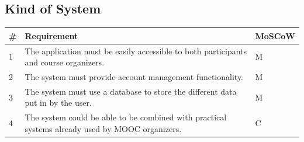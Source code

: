 \subsection{Kind of System}
\begin{tabular}{ | p{0.5cm} | p{12cm} | p{2cm} | }
\hline
\textbf{\#} & \textbf{Requirement} & \textbf{MoSCoW} \\ \hline
1 & The application must be easily accessible to both participants and course organizers. & M \\ \hline
2 & The system must provide account management functionality. & M \\ \hline
3 & The system must use a database to store the different data put in by the user. & M \\ \hline
4 & The system could be able to be combined with practical systems already used by MOOC organizers. & C \\
\hline
\end{tabular}

